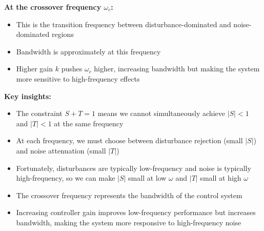 \documentclass[11pt,a4paper]{article}
\begin{document}
\textbf{At the crossover frequency $\omega_c$:}
\begin{itemize}
  \item This is the transition frequency between disturbance-dominated and noise-dominated regions
  \item Bandwidth is approximately at this frequency
  \item Higher gain $k$ pushes $\omega_c$ higher, increasing bandwidth but making the system more sensitive to high-frequency effects
\end{itemize}

\textbf{Key insights:}
\begin{itemize}
  \item The constraint $S + T = 1$ means we cannot simultaneously achieve $|S| < 1$ and $|T| < 1$ at the same frequency
  \item At each frequency, we must choose between disturbance rejection (small $|S|$) and noise attenuation (small $|T|$)
  \item Fortunately, disturbances are typically low-frequency and noise is typically high-frequency, so we can make $|S|$ small at low $\omega$ and $|T|$ small at high $\omega$
  \item The crossover frequency represents the bandwidth of the control system
  \item Increasing controller gain improves low-frequency performance but increases bandwidth, making the system more responsive to high-frequency noise
\end{itemize}
\end{document}
